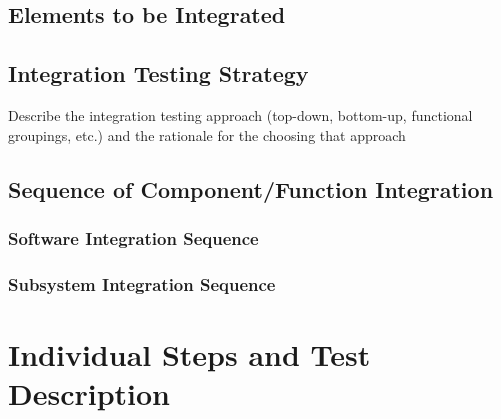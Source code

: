 \documentclass{article}
\begin{document}
\subsection{Elements to be Integrated}
\subsection{Integration Testing Strategy}
Describe the integration testing approach (top-down, bottom-up, functional groupings, etc.) and the rationale for the choosing that approach
\subsection{Sequence of Component/Function Integration}
\subsubsection{Software Integration Sequence}
\subsubsection{Subsystem Integration Sequence}
\section{Individual Steps and Test Description}
\end{document}
